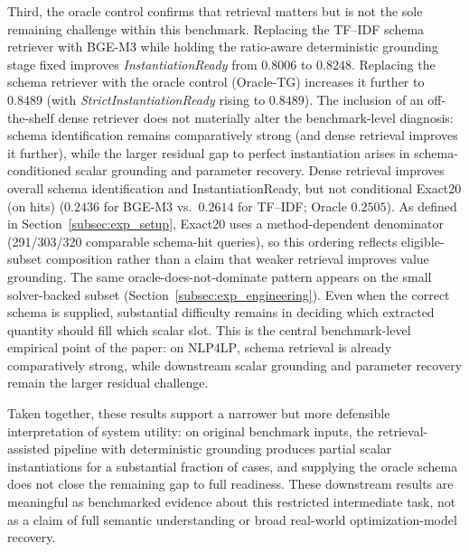 \documentclass[pdflatex,sn-basic,Numbered]{sn-jnl}
\begin{document}
Third, the oracle control confirms that retrieval matters but is not the sole remaining challenge within this benchmark. Replacing the TF--IDF schema retriever with BGE-M3 while holding the ratio-aware deterministic grounding stage fixed improves \textit{InstantiationReady} from $0.8006$ to $0.8248$. Replacing the schema retriever with the oracle control (Oracle-TG) increases it further to $0.8489$ (with \textit{StrictInstantiationReady} rising to $0.8489$). The inclusion of an off-the-shelf dense retriever does not materially alter the benchmark-level diagnosis: schema identification remains comparatively strong (and dense retrieval improves it further), while the larger residual gap to perfect instantiation arises in schema-conditioned scalar grounding and parameter recovery. Dense retrieval improves overall schema identification and InstantiationReady, but not conditional Exact20 (on hits) ($0.2436$ for BGE-M3 vs.\ $0.2614$ for TF--IDF; Oracle $0.2505$). As defined in Section~\ref{subsec:exp_setup}, Exact20 uses a method-dependent denominator (291/303/320 comparable schema-hit queries), so this ordering reflects eligible-subset composition rather than a claim that weaker retrieval improves value grounding. The same oracle-does-not-dominate pattern appears on the small solver-backed subset (Section~\ref{subsec:exp_engineering}). Even when the correct schema is supplied, substantial difficulty remains in deciding which extracted quantity should fill which scalar slot. This is the central benchmark-level empirical point of the paper: on \textsc{NLP4LP}, schema retrieval is already comparatively strong, while downstream scalar grounding and parameter recovery remain the larger residual challenge.

Taken together, these results support a narrower but more defensible interpretation of system utility: on original benchmark inputs, the retrieval-assisted pipeline with deterministic grounding produces partial scalar instantiations for a substantial fraction of cases, and supplying the oracle schema does not close the remaining gap to full readiness. These downstream results are meaningful as benchmarked evidence about this restricted intermediate task, not as a claim of full semantic understanding or broad real-world optimization-model recovery.
\end{document}
